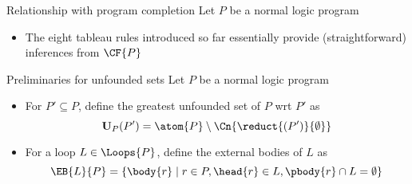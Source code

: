 \begin{frame}{Relationship with program completion}
  \bigskip
  Let $P$ be a normal logic program

  \begin{itemize}
  \item <1-> The eight tableau rules introduced so far essentially provide
    (straightforward) inferences from $\CF{P}$  %
  \end{itemize}
\end{frame}
\begin{frame}{Preliminaries for unfounded sets}
  \bigskip
  Let $P$ be a normal logic program
  \begin{itemize}
\item<1-> For $P'\subseteq P$, define the \alert{greatest unfounded set} of $P$ wrt $P'$ as
\[
\mathbf{U}_P(P') = \atom{P}\setminus \Cn{\reduct{(P')}{\emptyset}}
\]
\item<2-> For a loop $L \in \Loops{P}$, define the \alert{external bodies} of $L$ as
\[
\EB{L}{P} = \{\body{r} \mid r \in P, \head{r} \in L, \pbody{r} \cap L = \emptyset\}
\]
\end{itemize}
\end{frame}
